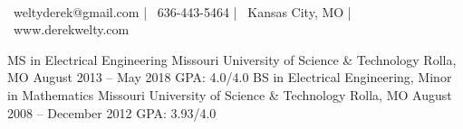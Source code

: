 \documentclass[]{awesome-cv}
\begin{document}
    
\begin{center}
	  \\
	\vspace{2mm}
	{\faEnvelope\ weltyderek@gmail.com} | {\faMobile\ 636-443-5464} | {\faMapMarker\ Kansas City, MO} | {\faGlobe\ www.derekwelty.com}
\end{center}
\begin{cventries}
	\cventry
	{MS in Electrical Engineering}
	{Missouri University of Science \& Technology}
	{Rolla, MO}
	{August 2013 – May 2018}
	{GPA: 4.0/4.0}
	\cventry
	{BS in Electrical Engineering, Minor in Mathematics}
	{Missouri University of Science \& Technology}
	{Rolla, MO}
	{August 2008 – December 2012}
	{GPA: 3.93/4.0}
\end{cventries}
\end{document}

